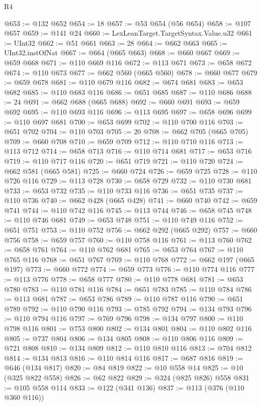 \begin{lexlean}{R4}
\begin{coremodule}
@653 := @132 @652
@654 := 18
@657 := @53 @654 (@56 @654)
@658 := @107 @657
@659 := @141 @24
@660 := LexLeanTarget.TargetSyntax.Value.u32
@661 := UInt32
@662 := @51 @661
@663 := 28
@664 := @662 @663
@665 := UInt32.instOfNat
@667 := @664 (@665 @663)
@668 := @660 @667
@669 := @659 @668
@671 := @110 @669 @116
@672 := @113 @671
@673 := @658 @672
@674 := @110 @673
@677 := @662 @560 (@665 @560)
@678 := @660 @677
@679 := @659 @678
@681 := @110 @679 @116
@682 := @674 @681
@683 := @653 @682
@685 := @110 @683 @116
@686 := @651 @685
@687 := @110 @686
@688 := 24
@691 := @662 @688 (@665 @688)
@692 := @660 @691
@693 := @659 @692
@695 := @110 @693 @116
@696 := @113 @695
@697 := @658 @696
@699 := @110 @697 @681
@700 := @653 @699
@702 := @110 @700 @116
@703 := @651 @702
@704 := @110 @703
@705 := 20
@708 := @662 @705 (@665 @705)
@709 := @660 @708
@710 := @659 @709
@712 := @110 @710 @116
@713 := @113 @712
@714 := @658 @713
@716 := @110 @714 @681
@717 := @653 @716
@719 := @110 @717 @116
@720 := @651 @719
@721 := @110 @720
@724 := @662 @581 (@665 @581)
@725 := @660 @724
@726 := @659 @725
@728 := @110 @726 @116
@729 := @113 @728
@730 := @658 @729
@732 := @110 @730 @681
@733 := @653 @732
@735 := @110 @733 @116
@736 := @651 @735
@737 := @110 @736
@740 := @662 @428 (@665 @428)
@741 := @660 @740
@742 := @659 @741
@744 := @110 @742 @116
@745 := @113 @744
@746 := @658 @745
@748 := @110 @746 @681
@749 := @653 @748
@751 := @110 @749 @116
@752 := @651 @751
@753 := @110 @752
@756 := @662 @292 (@665 @292)
@757 := @660 @756
@758 := @659 @757
@760 := @110 @758 @116
@761 := @113 @760
@762 := @658 @761
@764 := @110 @762 @681
@765 := @653 @764
@767 := @110 @765 @116
@768 := @651 @767
@769 := @110 @768
@772 := @662 @197 (@665 @197)
@773 := @660 @772
@774 := @659 @773
@776 := @110 @774 @116
@777 := @113 @776
@778 := @658 @777
@780 := @110 @778 @681
@781 := @653 @780
@783 := @110 @781 @116
@784 := @651 @783
@785 := @110 @784
@786 := @113 @681
@787 := @653 @786
@789 := @110 @787 @116
@790 := @651 @789
@792 := @110 @790 @116
@793 := @785 @792
@794 := @134 @793
@796 := @110 @794 @116
@797 := @769 @796
@798 := @134 @797
@800 := @110 @798 @116
@801 := @753 @800
@802 := @134 @801
@804 := @110 @802 @116
@805 := @737 @804
@806 := @134 @805
@808 := @110 @806 @116
@809 := @721 @808
@810 := @134 @809
@812 := @110 @810 @116
@813 := @704 @812
@814 := @134 @813
@816 := @110 @814 @116
@817 := @687 @816
@819 := @646 (@134 @817)
@820 := @84 @819
@822 := @10 @558 @14
@825 := @10 (@325 @822 @558)
@826 := @62 @822
@829 := @324 (@825 @826) @558
@831 := @105 @558 @114
@833 := @122 (@341 @136)
@837 := @113 (@376 (@110 @360 @116))

\end{coremodule}
\end{lexlean}
